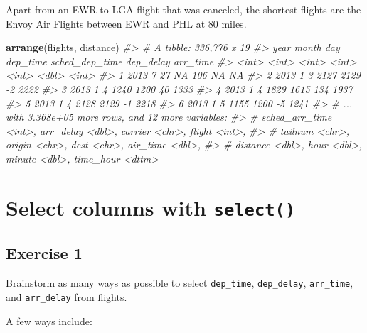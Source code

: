 \documentclass[]{book}
\newenvironment{Shaded}{\begin{snugshade}}{\end{snugshade}}
\newcommand{\CommentTok}[1]{\textcolor[rgb]{0.56,0.35,0.01}{\textit{#1}}}
\newcommand{\KeywordTok}[1]{\textcolor[rgb]{0.13,0.29,0.53}{\textbf{#1}}}
\newcommand{\NormalTok}[1]{#1}
\theoremstyle{plain}
\theoremstyle{remark}
\theoremstyle{definition}
\theoremstyle{definition}
\theoremstyle{definition}
\theoremstyle{remark}
\begin{document}
Apart from an EWR to LGA flight that was canceled, the shortest flights
are the Envoy Air Flights between EWR and PHL at 80 miles.

\begin{Shaded}
\begin{Highlighting}[]
\KeywordTok{arrange}\NormalTok{(flights, distance)}
\CommentTok{#> # A tibble: 336,776 x 19}
\CommentTok{#>    year month   day dep_time sched_dep_time dep_delay arr_time}
\CommentTok{#>   <int> <int> <int>    <int>          <int>     <dbl>    <int>}
\CommentTok{#> 1  2013     7    27       NA            106        NA       NA}
\CommentTok{#> 2  2013     1     3     2127           2129        -2     2222}
\CommentTok{#> 3  2013     1     4     1240           1200        40     1333}
\CommentTok{#> 4  2013     1     4     1829           1615       134     1937}
\CommentTok{#> 5  2013     1     4     2128           2129        -1     2218}
\CommentTok{#> 6  2013     1     5     1155           1200        -5     1241}
\CommentTok{#> # ... with 3.368e+05 more rows, and 12 more variables:}
\CommentTok{#> #   sched_arr_time <int>, arr_delay <dbl>, carrier <chr>, flight <int>,}
\CommentTok{#> #   tailnum <chr>, origin <chr>, dest <chr>, air_time <dbl>,}
\CommentTok{#> #   distance <dbl>, hour <dbl>, minute <dbl>, time_hour <dttm>}
\end{Highlighting}
\end{Shaded}

\hypertarget{select-columns-with-select}{%
\section{\texorpdfstring{Select columns with
\texttt{select()}}{Select columns with select()}}\label{select-columns-with-select}}

\hypertarget{exercise-1-8}{%
\subsection{Exercise 1}\label{exercise-1-8}}

Brainstorm as many ways as possible to select \texttt{dep\_time},
\texttt{dep\_delay}, \texttt{arr\_time}, and \texttt{arr\_delay} from
flights.

A few ways include:
\end{document}

